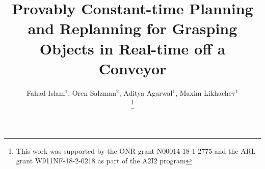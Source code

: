 \documentclass[conference]{IEEEtran}
\begin{document}
\title{Provably Constant-time Planning and Replanning for Grasping Objects in Real-time off a Conveyor}


\author{ Fahad Islam$^{1}$,
  Oren Salzman$^{2}$,
  Aditya Agarwal$^{1}$,
  Maxim Likhachev$^{1}$\\
    \thanks{This work was supported by the ONR grant N00014-18-1-2775 and the ARL grant W911NF-18-2-0218 as part of the A2I2 program}
}





% 
\end{document}
